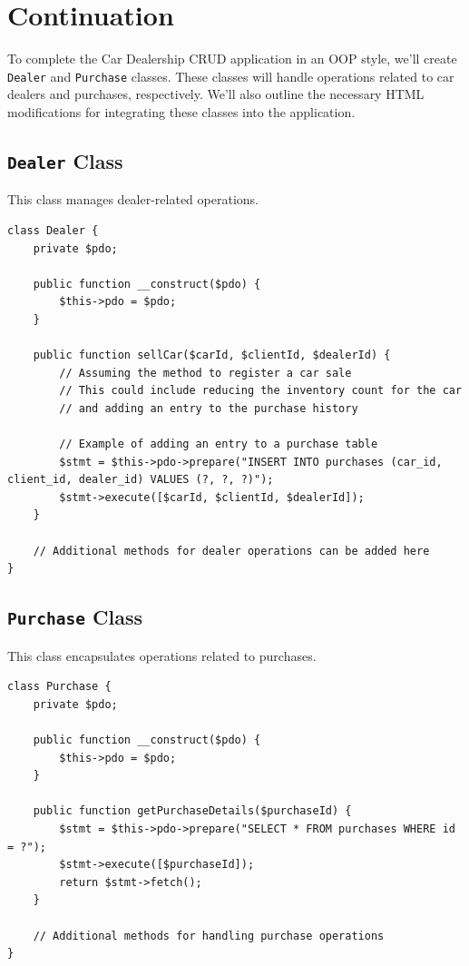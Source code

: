 \documentclass[11pt]{article}
\begin{document}
\section{Continuation}
\label{sec:orgd1f4fb6}
To complete the Car Dealership CRUD application in an OOP style, we'll
create \texttt{Dealer} and \texttt{Purchase} classes. These classes will handle
operations related to car dealers and purchases, respectively. We'll
also outline the necessary HTML modifications for integrating these
classes into the application.

\subsection{\texttt{Dealer} Class}
\label{sec:orgf537bd9}
This class manages dealer-related operations.

\begin{verbatim}
class Dealer {
    private $pdo;

    public function __construct($pdo) {
        $this->pdo = $pdo;
    }

    public function sellCar($carId, $clientId, $dealerId) {
        // Assuming the method to register a car sale
        // This could include reducing the inventory count for the car
        // and adding an entry to the purchase history

        // Example of adding an entry to a purchase table
        $stmt = $this->pdo->prepare("INSERT INTO purchases (car_id, client_id, dealer_id) VALUES (?, ?, ?)");
        $stmt->execute([$carId, $clientId, $dealerId]);
    }

    // Additional methods for dealer operations can be added here
}
\end{verbatim}

\subsection{\texttt{Purchase} Class}
\label{sec:org8935ce9}
This class encapsulates operations related to purchases.

\begin{verbatim}
class Purchase {
    private $pdo;

    public function __construct($pdo) {
        $this->pdo = $pdo;
    }

    public function getPurchaseDetails($purchaseId) {
        $stmt = $this->pdo->prepare("SELECT * FROM purchases WHERE id = ?");
        $stmt->execute([$purchaseId]);
        return $stmt->fetch();
    }

    // Additional methods for handling purchase operations
}
\end{verbatim}
\end{document}
